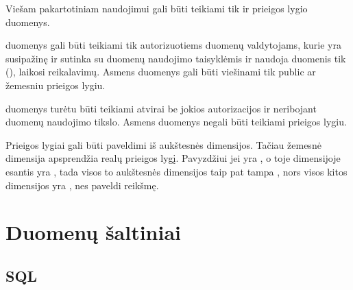 \documentclass[letterpaper,10pt,lithuanian]{sphinxmanual}
\begin{document}
\sphinxAtStartPar
Viešam pakartotiniam naudojimui gali būti teikiami tik  ir 
prieigos lygio duomenys.

\sphinxAtStartPar
{} duomenys gali būti teikiami tik autorizuotiems duomenų valdytojams,
kurie yra susipažinę ir sutinka su duomenų naudojimo taisyklėmis ir naudoja
duomenis tik  (), laikosi 
reikalavimų.
Asmens duomenys gali būti viešinami tik public ar žemesniu prieigos lygiu.

\sphinxAtStartPar
{} duomenys turėtu būti teikiami atvirai be jokios autorizacijos ir
neribojant duomenų naudojimo tikslo. Asmens duomenys negali būti teikiami 
prieigos lygiu.

\sphinxAtStartPar
Prieigos lygiai gali būti paveldimi iš aukštesnės dimensijos. Tačiau žemesnė
dimensija apsprendžia realų prieigos lygį. Pavyzdžiui jei {\hyperref[\detokenize{dimensijos:dataset.access}]{}}
yra , o toje {\hyperref[\detokenize{formatas:dataset}]{}} dimensijoje esantis {\hyperref[\detokenize{formatas:property}]{}} yra
, tada visos to {\hyperref[\detokenize{formatas:property}]{}} aukštesnės dimensijos taip pat tampa
, nors visos kitos dimensijos yra , nes paveldi
{\hyperref[\detokenize{dimensijos:dataset.access}]{}} reikšmę.

\sphinxstepscope


\section{Duomenų šaltiniai}
\label{\detokenize{saltiniai:duomenu-saltiniai}}\label{\detokenize{saltiniai:id1}}\label{\detokenize{saltiniai::doc}}

\subsection{SQL}
\label{\detokenize{saltiniai:sql}}\label{\detokenize{saltiniai:resource-type-sql}}\label{\detokenize{saltiniai:sql-resource-source}}
\end{document}
